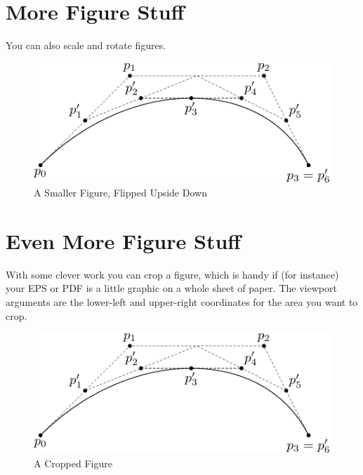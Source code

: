 \documentclass[12pt,twoside]{reedthesis}
\begin{document}
\section{More Figure Stuff}
You can also scale and rotate figures.
        \begin{figure}[h!]

               \centering
            \includegraphics[scale=0.5,angle=180]{subdivision}
             \caption{A Smaller Figure, Flipped Upside Down}
         \label{subd2}
        \end{figure}

\section{Even More Figure Stuff}
With some clever work you can crop a figure, which is handy if (for instance) your EPS or PDF is a little graphic on a whole sheet of paper. The viewport arguments are the lower-left and upper-right coordinates for the area you want to crop.

        \begin{figure}[h!]
                       \centering
           \includegraphics[clip=true, viewport=.0in .0in 1in 1in]{subdivision}
            \caption{A Cropped Figure}
         \label{subd3}
        \end{figure}
\end{document}
